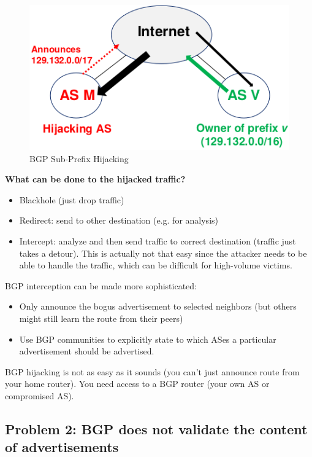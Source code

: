 \documentclass[11pt,oneside,a4paper]{article}
\begin{document}
\begin{figure}
	\centering
	\includegraphics[width=0.4\linewidth]{figures/bgp_subprefix_hijack}
	\caption{BGP Sub-Prefix Hijacking}
	\label{fig:bgpsubprefixhijack}
\end{figure}

\textbf{What can be done to the hijacked traffic?}

\vspace{-\topsep}
\begin{itemize}
	\setlength{\itemsep}{0pt}
	\setlength{\parskip}{0pt}
	\item Blackhole (just drop traffic)
	\item Redirect: send to other destination (e.g. for analysis)
	\item Intercept: analyze and then send traffic to correct destination (traffic just takes a detour). This is actually not that easy since the attacker needs to be able to handle the traffic, which can be difficult for high-volume victims.
\end{itemize}
\vspace{-\topsep}

BGP interception can be made more sophisticated:

\vspace{-\topsep}
\begin{itemize}
	\setlength{\itemsep}{0pt}
	\setlength{\parskip}{0pt}
	\item Only announce the bogus advertisement to selected neighbors (but others might still learn the route from their peers)
	\item Use BGP communities to explicitly state to which ASes a particular advertisement should be advertised.
\end{itemize}
\vspace{-\topsep}

BGP hijacking is not as easy as it sounds (you can't just announce route from your home router). You need access to a BGP router (your own AS or compromised AS).

\subsection{Problem 2: BGP does not validate the content of	advertisements}
\end{document}
